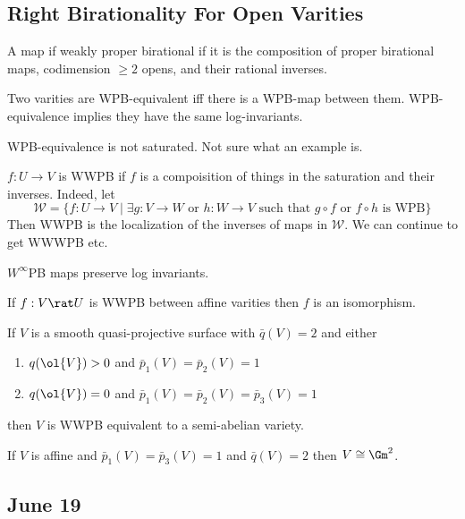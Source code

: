 \documentclass[12pt]{article}
\theoremstyle{plain}
\begin{document}
\subsection{Right Birationality For Open Varities}

\begin{defn}
A map if weakly proper birational if it is the composition of proper birational maps, codimension $\ge 2$ opens, and their rational inverses.
\end{defn}

Two varities are WPB-equivalent iff there is a WPB-map between them. WPB-equivalence implies they have the same log-invariants.

\begin{rmk}
WPB-equivalence is not saturated. Not sure what an example is.
\end{rmk}

\begin{defn}
$f : U \to V$ is WWPB if $f$ is a compoisition of things in the saturation and their inverses. Indeed, let 
\[ \mathcal{W} = \{ f : U \to V \mid \exists g : V \to W \text{ or } h : W \to V \text{ such that } g \circ f \text{ or } f \circ h \text{ is WPB} \} \]
Then WWPB is the localization of the inverses of maps in $\mathcal{W}$. We can continue to get WWWPB etc. 
\end{defn}

$W^\infty$PB maps preserve log invariants. 

\begin{prop}
If $f : V \rat U$ is WWPB between affine varities then $f$ is an isomorphism. 
\end{prop}

\begin{theorem}
If $V$ is a smooth quasi-projective surface with $\bar{q}(V) = 2$ and either
\begin{enumerate}
\item $q(\ol{V}) > 0$ and $\bar{p}_1(V) = \bar{p}_2(V) = 1$
\item $q(\ol{V}) = 0$ and $\bar{p}_1(V) = \bar{p}_2(V) = \bar{p}_3(V) = 1$
\end{enumerate} 
then $V$ is WWPB equivalent to a semi-abelian variety. 
\end{theorem}

\begin{cor}
If $V$ is affine and $\bar{p}_1(V) = \bar{p}_3(V) = 1$ and $\bar{q}(V) = 2$ then $V \cong \Gm^2$. 
\end{cor}


\subsection{June 19}
\end{document}
